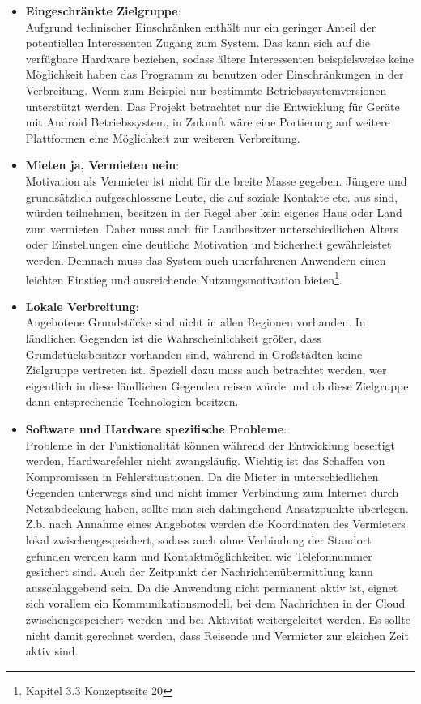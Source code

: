 \begin{itemize}
   \item \textbf{Eingeschränkte Zielgruppe}:\\
   Aufgrund technischer Einschränken enthält nur ein geringer Anteil der potentiellen Interessenten Zugang zum System. Das kann sich auf die verfügbare Hardware beziehen, sodass ältere Interessenten beispielsweise keine Möglichkeit haben das Programm zu benutzen oder Einschränkungen in der Verbreitung. Wenn zum Beispiel nur bestimmte Betriebssystemversionen unterstützt werden. Das Projekt betrachtet nur die Entwicklung für Geräte mit Android Betriebssystem, in Zukunft wäre eine Portierung auf weitere Plattformen eine Möglichkeit zur weiteren Verbreitung.
     
   \item
   \textbf{Mieten ja, Vermieten nein}:\\ Motivation als Vermieter ist nicht für die breite Masse gegeben. Jüngere und grundsätzlich aufgeschlossene Leute, die auf soziale Kontakte etc. aus sind, würden teilnehmen, besitzen in der Regel aber kein eigenes Haus oder Land zum vermieten. Daher muss auch für Landbesitzer unterschiedlichen Alters oder Einstellungen eine deutliche Motivation und Sicherheit gewährleistet werden. Demnach muss das System auch unerfahrenen Anwendern einen leichten Einstieg und ausreichende Nutzungsmotivation bieten\footnote{Kapitel 3.3 Konzeptseite 20}.

   \item
   \textbf{Lokale Verbreitung}:\\ Angebotene Grundstücke sind nicht in allen Regionen vorhanden. In ländlichen Gegenden ist die Wahrscheinlichkeit größer, dass Grundstücksbesitzer vorhanden sind, während in Großstädten keine Zielgruppe vertreten ist. Speziell dazu muss auch betrachtet werden, wer eigentlich in diese ländlichen Gegenden reisen würde und ob diese Zielgruppe dann entsprechende Technologien besitzen.

   \item
   \textbf{Software und Hardware spezifische Probleme}:\\
   Probleme in der Funktionalität können während der Entwicklung beseitigt werden, Hardwarefehler nicht zwangsläufig. Wichtig ist das Schaffen von Kompromissen in Fehlersituationen. 
   Da die Mieter in unterschiedlichen Gegenden unterwegs sind und nicht immer Verbindung zum Internet durch Netzabdeckung haben, sollte man sich dahingehend Ansatzpunkte überlegen. Z.b. nach Annahme eines Angebotes werden die Koordinaten des Vermieters lokal zwischengespeichert, sodass auch ohne Verbindung der Standort gefunden werden kann und Kontaktmöglichkeiten wie Telefonnummer gesichert sind. Auch der Zeitpunkt der Nachrichtenübermittlung kann ausschlaggebend sein. Da die Anwendung nicht permanent aktiv ist, eignet sich vorallem ein Kommunikationsmodell, bei dem Nachrichten in der Cloud zwischengespeichert werden und bei Aktivität weitergeleitet werden. Es sollte nicht damit gerechnet werden, dass Reisende und Vermieter zur gleichen Zeit aktiv sind. 

\end{itemize}

